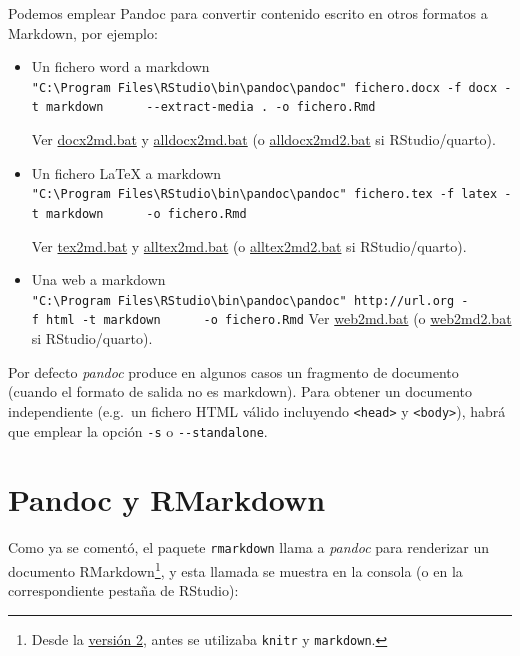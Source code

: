 \documentclass[
]{book}
\theoremstyle{break}
\theoremstyle{nonumberplain}
\begin{document}
Podemos emplear Pandoc para convertir contenido escrito en otros formatos a Markdown, por ejemplo:

\begin{itemize}
\item
  Un fichero word a markdown
  \texttt{"C:\textbackslash{}Program\ Files\textbackslash{}RStudio\textbackslash{}bin\textbackslash{}pandoc\textbackslash{}pandoc"\ fichero.docx\ -f\ docx\ -t\ markdown\ \ \ \ \ \ -\/-extract-media\ .\ -o\ fichero.Rmd}

  Ver \href{ejemplos/rmarkdown/docx2md.bat}{docx2md.bat} y \href{ejemplos/rmarkdown/alldocx2md.bat}{alldocx2md.bat} (o \href{ejemplos/rmarkdown/alldocx2md2.bat}{alldocx2md2.bat} si RStudio/quarto).
\item
  Un fichero LaTeX a markdown
  \texttt{"C:\textbackslash{}Program\ Files\textbackslash{}RStudio\textbackslash{}bin\textbackslash{}pandoc\textbackslash{}pandoc"\ fichero.tex\ -f\ latex\ -t\ markdown\ \ \ \ \ \ -o\ fichero.Rmd}

  Ver \href{ejemplos/rmarkdown/tex2md.bat}{tex2md.bat} y \href{ejemplos/rmarkdown/alltex2md.bat}{alltex2md.bat} (o \href{ejemplos/rmarkdown/alltex2md2.bat}{alltex2md2.bat} si RStudio/quarto).
\item
  Una web a markdown
  \texttt{"C:\textbackslash{}Program\ Files\textbackslash{}RStudio\textbackslash{}bin\textbackslash{}pandoc\textbackslash{}pandoc"\ http://url.org\ -f\ html\ -t\ markdown\ \ \ \ \ \ -o\ fichero.Rmd}
  Ver \href{ejemplos/rmarkdown/web2md.bat}{web2md.bat} (o \href{ejemplos/rmarkdown/web2md2.bat}{web2md2.bat} si RStudio/quarto).
\end{itemize}

Por defecto \emph{pandoc} produce en algunos casos un fragmento de documento
(cuando el formato de salida no es markdown).
Para obtener un documento independiente (e.g.~un fichero HTML válido incluyendo \texttt{\textless{}head\textgreater{}} y \texttt{\textless{}body\textgreater{}}),
habrá que emplear la opción \texttt{-s} o \texttt{-\/-standalone}.

\hypertarget{pandoc-y-rmarkdown}{%
\section{Pandoc y RMarkdown}\label{pandoc-y-rmarkdown}}

Como ya se comentó, el paquete \texttt{rmarkdown} llama a \emph{pandoc} para renderizar un documento
RMarkdown\footnote{Desde la \href{https://blog.rstudio.org/2014/06/18/r-markdown-v2/}{versión 2},
  antes se utilizaba \texttt{knitr} y \texttt{markdown}.}, y esta llamada se muestra en la consola
(o en la correspondiente pestaña de RStudio):
\end{document}
